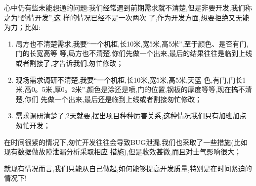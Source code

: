 \documentclass[11pt]{article}
\begin{document}
\begin{staff}
\qlogo 心中仍有些未能想通的问题:我们经常遇到前期需求就不清楚,但是非要开发,我们称之为``酌情开发'',这
  样的情况已经不是一次两次 了,作为开发方面,想要拒绝又无能为力；比如:
\begin{enumerate}
\item 局方也不清楚需求,我要``一个机柜,长10米,宽5米,高5米'',至于颜色、是否有门,门的长宽高等
  等,局方也不清楚,你们先做一个出来,最后的结果往往是临到上线或者割接了,才告诉我们,匆忙修改；

\item 现场需求调研不清楚,我要``一个机柜,长10米,宽5米,高5米,天蓝
  色,有门,门长1米,高0。5米,厚0。2米'',颜色是涂还是喷,门的位置,钢板的厚度等等,现在搞不清楚,你们
  先做一个出来,最后还是临到上线或者割接匆忙修改；

\item 需求调研清楚了,2天就要,摆出项目种种厉害关系,这种情况我们只有加班加点匆忙开发；
\end{enumerate}

在时间很紧的情况下,匆忙开发往往会导致BUG泄漏,我们也采取了一些措施(比如现有数据做故障泄漏分析采取相应
措施),但是收效甚微,而且对士气影响很大；

就现有情况而言,我们只能从自己做起,如何能够提高开发质量,特别是在时间紧迫的情况下!
\end{staff}
\end{document}
